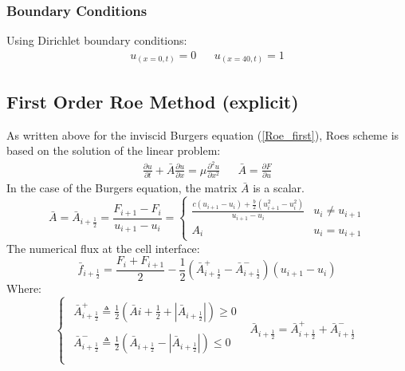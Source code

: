 \documentclass[11pt, a4paper]{article}
\begin{document}
\subsubsection{Boundary Conditions}
Using Dirichlet boundary conditions:
\begin{equation}
    \begin{matrix}
        \displaystyle u_{\left(x=0,t\right)}=0 && \displaystyle u_{\left(x=40,t\right)}=1
    \end{matrix}
\end{equation}

\subsection{First Order Roe Method (explicit)}
As written above for the inviscid Burgers equation (\ref{Roe_first}), Roes scheme is based on the solution of the linear problem:
\begin{equation}
    \begin{matrix}
        \displaystyle\frac{\partial u}{\partial t} + \bar{A}\frac{\partial u}{\partial x}=\mu\frac{\partial^2u}{\partial x^2} && \displaystyle \bar{A}=\frac{\partial F}{\partial u}
    \end{matrix}         
\end{equation}
In the case of the Burgers equation, the matrix $\bar{A}$ is a scalar.
\begin{equation}
    \bar{A}=\bar{A}_{i+\frac{1}{2}}=\frac{F_{i+1}-F_i}{u_{i+1}-u_i}=\left\{\begin{array}{cc} \displaystyle\frac{\displaystyle c\left(u_{i+1}-u_i\right)+\frac{b}{2}\left(u_{i+1}^2-u_i^2\right)}{u_{i+1}-u_i} & u_i\neq u_{i+1} \\ 
    A_i & u_i=u_{i+1} \end{array}\right.  
\end{equation} 
The numerical flux at the cell interface:
\begin{equation}
    \displaystyle \bar{f}_{i+\frac{1}{2}}=\frac{F_i+F_{i+1}}{2}-\frac{1}{2}\left(\bar{A}_{i+\frac{1}{2}}^+-\bar{A}_{i+\frac{1}{2}}^-\right)\left(u_{i+1}-u_i\right)
\end{equation}
Where:
\begin{equation}
    \left\{\begin{array}{cc}
        \begin{array}{c}
            \bar{A}_{i+\frac{1}{2}}^+\triangleq\displaystyle\frac{1}{2}\left(\bar{A}{i+\frac{1}{2}}+\left|\bar{A}_{i+\frac{1}{2}}\right|\right)\geq0 \\\\
            \bar{A}_{i+\frac{1}{2}}^-\triangleq\displaystyle\frac{1}{2}\left(\bar{A}_{i+\frac{1}{2}}-\left|\bar{A}_{i+\frac{1}{2}}\right|\right)\leq0 \\
        \end{array} & \bar{A}_{i+\frac{1}{2}}=\bar{A}_{i+\frac{1}{2}}^++\bar{A}_{i+\frac{1}{2}}^-
    \end{array}\right.
\end{equation}
\end{document}
